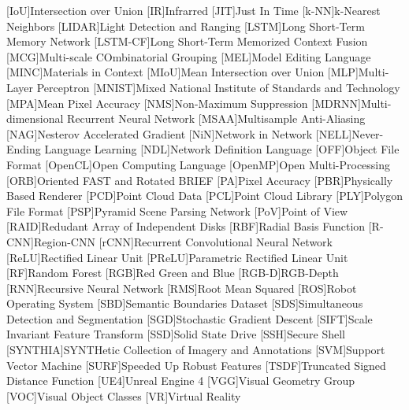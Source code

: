 \begin{acronym}
    [IoU]{Intersection over Union}
	[IR]{Infrarred}
    [JIT]{Just In Time}
    [k-NN]{k-Nearest Neighbors}
    [LIDAR]{Light Detection and Ranging}
    [LSTM]{Long Short-Term Memory Network}
    [LSTM-CF]{Long Short-Term Memorized Context Fusion}
    [MCG]{Multi-scale COmbinatorial Grouping}
    [MEL]{Model Editing Language}
    [MINC]{Materials in Context}
    [MIoU]{Mean Intersection over Union}
	[MLP]{Multi-Layer Perceptron}
    [MNIST]{Mixed National Institute of Standards and Technology}
    [MPA]{Mean Pixel Accuracy}
    [NMS]{Non-Maximum Suppression}
    [MDRNN]{Multi-dimensional Recurrent Neural Network}
    [MSAA]{Multisample Anti-Aliasing}
    [NAG]{Nesterov Accelerated Gradient}
    [NiN]{Network in Network}
    [NELL]{Never-Ending Language Learning}
	[NDL]{Network Definition Language}
	[OFF]{Object File Format}
	[OpenCL]{Open Computing Language}
	[OpenMP]{Open Multi-Processing}
    [ORB]{Oriented FAST and Rotated BRIEF}
    [PA]{Pixel Accuracy}
    [PBR]{Physically Based Renderer}
	[PCD]{Point Cloud Data}
    [PCL]{Point Cloud Library}
    [PLY]{Polygon File Format}
    [PSP]{Pyramid Scene Parsing Network}
	[PoV]{Point of View}
	[RAID]{Redudant Array of Independent Disks}
    [RBF]{Radial Basis Function}
    [R-CNN]{Region-CNN}
    [rCNN]{Recurrent Convolutional Neural Network}
	[ReLU]{Rectified Linear Unit}
    [PReLU]{Parametric Rectified Linear Unit}
    [RF]{Random Forest}
	[RGB]{Red Green and Blue}
    [RGB-D]{RGB-Depth}
	[RNN]{Recursive Neural Network}
    [RMS]{Root Mean Squared}
    [ROS]{Robot Operating System}
    [SBD]{Semantic Boundaries Dataset}
    [SDS]{Simultaneous Detection and Segmentation}
	[SGD]{Stochastic Gradient Descent}
	[SIFT]{Scale Invariant Feature Transform}
	[SSD]{Solid State Drive}
    [SSH]{Secure Shell}
    [SYNTHIA]{SYNTHetic Collection of Imagery and Annotations}
    [SVM]{Support Vector Machine}
	[SURF]{Speeded Up Robust Features}
    [TSDF]{Truncated Signed Distance Function}
    [UE4]{Unreal Engine 4}
    [VGG]{Visual Geometry Group}
    [VOC]{Visual Object Classes}
    [VR]{Virtual Reality}
\end{acronym}
